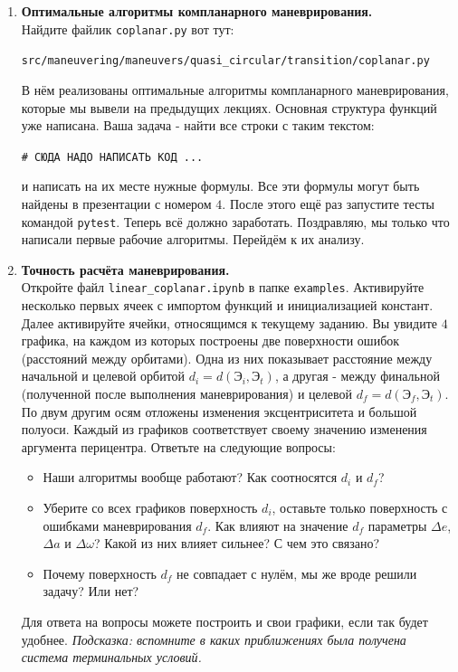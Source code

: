 \documentclass[12pt]{article}
\begin{document}
\begin{enumerate}
  \item \textbf{Оптимальные алгоритмы компланарного маневрирования.} \\
  Найдите файлик \texttt{coplanar.py} вот тут:
  \begin{center}
      \texttt{src/maneuvering/maneuvers/quasi\_circular/transition/coplanar.py}
  \end{center}
  В нём реализованы оптимальные алгоритмы компланарного маневрирования, которые мы вывели на предыдущих лекциях. Основная структура функций уже написана. Ваша задача - найти все строки с таким текстом:
  \begin{center}
      \texttt{\# СЮДА НАДО НАПИСАТЬ КОД ...}
  \end{center}
  и написать на их месте нужные формулы. Все эти формулы могут быть найдены в презентации с номером $4$. После этого ещё раз запустите тесты командой \texttt{pytest}. Теперь всё должно заработать. Поздравляю, мы только что написали первые рабочие алгоритмы. Перейдём к их анализу.

  \item \textbf{Точность расчёта маневрирования.} \\
  Откройте файл \texttt{linear\_coplanar.ipynb} в папке \texttt{examples}. Активируйте несколько первых ячеек с импортом функций и инициализацией констант. Далее активируйте ячейки, относящимся к текущему заданию. Вы увидите $4$ графика, на каждом из которых построены две поверхности ошибок (расстояний между орбитами). Одна из них показывает расстояние между начальной и целевой орбитой $d_i = d(\textbf{Э}_i, \textbf{Э}_t)$, а другая - между финальной (полученной после выполнения маневрирования) и целевой $d_f = d(\textbf{Э}_f, \textbf{Э}_t)$. По двум другим осям отложены изменения эксцентриситета и большой полуоси. Каждый из графиков соответствует своему значению изменения аргумента перицентра. Ответьте на следующие вопросы:
  \begin{itemize}
      \item Наши алгоритмы вообще работают? Как соотносятся $d_i$ и $d_f$? 
      \item Уберите со всех графиков поверхность $d_i$, оставьте только поверхность с ошибками маневрирования $d_f$. Как влияют на значение $d_f$ параметры $\Delta e$, $\Delta a$ и $\Delta \omega$? Какой из них влияет сильнее? С чем это связано?  
      \item Почему поверхность $d_f$ не совпадает с нулём, мы же вроде решили задачу? Или нет?
  \end{itemize}
  Для ответа на вопросы можете построить и свои графики, если так будет удобнее. \textit{Подсказка: вспомните в каких приближениях была получена система терминальных условий.}


\end{enumerate}
\end{document}
